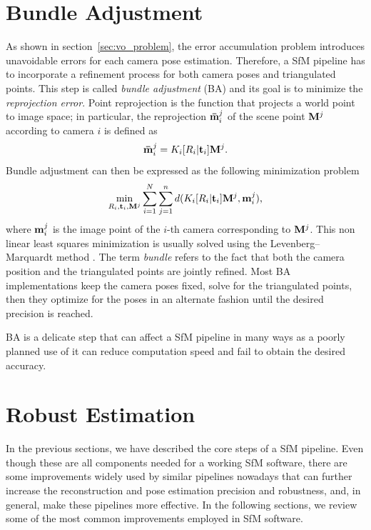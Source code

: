 \section{Bundle Adjustment}
As shown in section~\ref{sec:vo_problem}, the error accumulation problem introduces
unavoidable errors for each camera pose estimation. Therefore, a SfM pipeline has to incorporate a 
refinement process for both camera poses and triangulated points.
This step is called \textit{bundle adjustment} (BA) and its goal is to 
minimize the \textit{reprojection error}.
%
Point reprojection is the function that projects a world point to image space; 
in particular, the reprojection ${\mathbf{\bar{m}}_i}^j$ of the scene point 
$\mathbf{M}^j$ according to camera $i$ is defined as
%
\begin{equation*}
	{\mathbf{\bar{m}}_i}^j = K_i[R_i | \mathbf{t}_i]\mathbf{M}^j	\text{.}
\end{equation*}
%
\noindent Bundle adjustment can then be expressed as the following minimization 
problem
\begin{equation*}
	\label{eq:bundle_adj}
	\min_{R_i, \mathbf{t}_i, \mathbf{M}^j} 
	\sum_{i = 1}^N\sum_{j = 1}^n 
	d(K_i[R_i | \mathbf{t}_i]\mathbf{M}^j, \mathbf{m}_i^j) \text{,}
\end{equation*}
%
\noindent where $\mathbf{m}_i^j$ is the image point of the $i$-th camera
corresponding to $\mathbf{M}^j$.
This non linear least squares minimization is usually solved using the 
Levenberg–Marquardt method 
\cite{triggs1999bundle,Hartley2004,levenberg1944method}.
The term \textit{bundle} refers to the fact that both the camera position and
the triangulated points are jointly refined. Most BA implementations keep the 
camera poses fixed, solve for the triangulated points, then they optimize for the
poses in an alternate fashion until the desired precision is reached.

BA is a delicate step that can affect a SfM pipeline in many ways
\cite{lourakis2009sba,triggs1999bundle,Hartley2004} as a poorly planned use of 
it can reduce computation speed and fail to obtain the desired accuracy.

\section{Robust Estimation}
In the previous sections, we have described the core steps of a SfM pipeline.
Even though these are all components needed for a working SfM software, 
there are some improvements widely used by similar pipelines nowadays
that can further increase the reconstruction and pose estimation 
precision and robustness, and, in general, make these pipelines more effective.
In the following sections, we review some of the most common improvements 
employed in SfM software.

